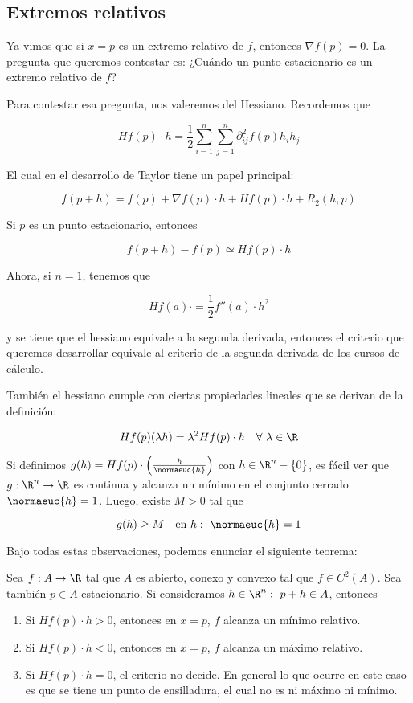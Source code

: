 \subsection{Extremos relativos}

Ya vimos que si $x = p$ es un extremo relativo de $f$, entonces $\nabla f(p) = 0$. La pregunta que queremos contestar es: ¿Cuándo un punto estacionario es un extremo relativo de $f$?

Para contestar esa pregunta, nos valeremos del Hessiano. Recordemos que

\[
H f(p) \cdot h = \frac{1}{2} \sum_{i=1}^n\sum_{j=1}^n \partial_{ij}^2 f(p) h_ih_j
\]

El cual en el desarrollo de Taylor tiene un papel principal:

\[
f(p+h) = f(p) + \nabla f(p) \cdot h + H f(p) \cdot h + R_2(h,p)
\]

Si $p$ es un punto estacionario, entonces

\[
f(p+h) - f(p) \simeq H f(p) \cdot h
\]

Ahora, si $n=1$, tenemos que

\[
H f(a) \cdot = \frac{1}{2} f''(a) \cdot h^2
\]

\noindent y se tiene que el hessiano equivale a la segunda derivada, entonces el criterio que queremos desarrollar equivale al criterio de la segunda derivada de los cursos de cálculo.

También el hessiano cumple con ciertas propiedades lineales que se derivan de la definición:

\[
H f(p) (\lambda h) = \lambda^2 H f(p) \cdot h \quad \forall~\lambda \in \R
\]

Si definimos $g(h) = H f(p) \cdot \left( \frac{h}{\normaeuc{h}} \right)$ con $h \in \R^n - \{0\}$, es fácil ver que $g: \R^n \rightarrow \R$ es continua y alcanza un mínimo en el conjunto cerrado $\normaeuc{h} = 1$. Luego, existe $M > 0$ tal que

\[
g(h) \geq M \quad \text{en $h:~\normaeuc{h} = 1$}
\]

Bajo todas estas observaciones, podemos enunciar el siguiente teorema:

\begin{teo}
    Sea $f: A \rightarrow \R$ tal que $A$ es abierto, conexo y convexo tal que $f \in C^2(A)$. Sea también $p \in A$ estacionario. Si consideramos $h \in \R^n:~p + h \in A$, entonces
    
    \begin{enumerate}
        \item Si $H f(p) \cdot h > 0$, entonces en $x=p$, $f$ alcanza un mínimo relativo.
        \item Si $H f(p) \cdot h < 0$, entonces en $x=p$, $f$ alcanza un máximo relativo.
        \item Si $H f(p) \cdot h = 0$, el criterio no decide. En general lo que ocurre en este caso es que se tiene un punto de ensilladura, el cual no es ni máximo ni mínimo.
    \end{enumerate}
\end{teo}

